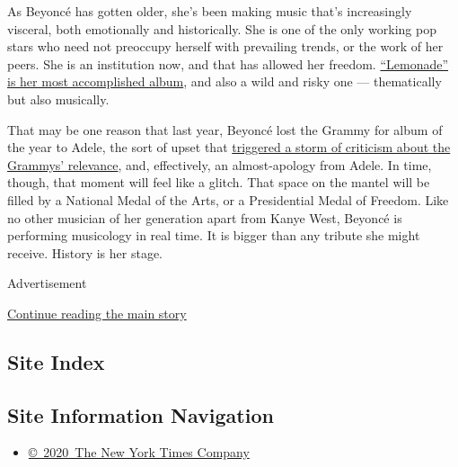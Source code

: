 As Beyoncé has gotten older, she's been making music that's increasingly
visceral, both emotionally and historically. She is one of the only
working pop stars who need not preoccupy herself with prevailing trends,
or the work of her peers. She is an institution now, and that has
allowed her freedom.
\href{https://www.nytimes.com/2016/04/25/arts/music/beyonce-lemonade.html}{``Lemonade''
is her most accomplished album}, and also a wild and risky one ---
thematically but also musically.

That may be one reason that last year, Beyoncé lost the Grammy for album
of the year to Adele, the sort of upset that
\href{https://www.nytimes.com/2017/02/13/arts/music/grammys-adele-beyonce-black-artists-race.html}{triggered
a storm of criticism about the Grammys' relevance}, and, effectively, an
almost-apology from Adele. In time, though, that moment will feel like a
glitch. That space on the mantel will be filled by a National Medal of
the Arts, or a Presidential Medal of Freedom. Like no other musician of
her generation apart from Kanye West, Beyoncé is performing musicology
in real time. It is bigger than any tribute she might receive. History
is her stage.

Advertisement

\protect\hyperlink{after-bottom}{Continue reading the main story}

\hypertarget{site-index}{%
\subsection{Site Index}\label{site-index}}

\hypertarget{site-information-navigation}{%
\subsection{Site Information
Navigation}\label{site-information-navigation}}

\begin{itemize}
\tightlist
\item
  \href{https://help.nytimes.com/hc/en-us/articles/115014792127-Copyright-notice}{©~2020~The
  New York Times Company}
\end{itemize}

